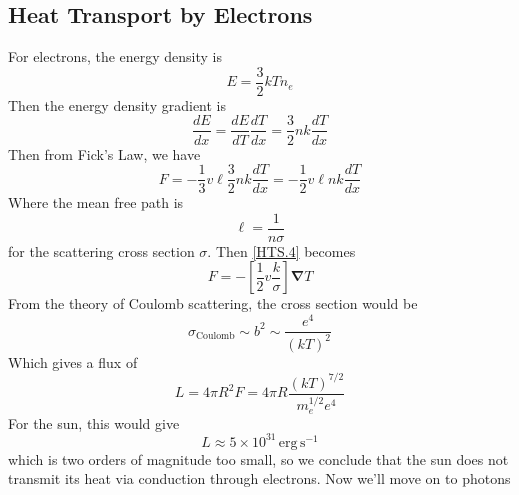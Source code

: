 \documentclass[10pt]{article}
\numberwithin{equation}{section}
\begin{document}
	\subsection{Heat Transport by Electrons} For electrons, the energy 
density is
	\begin{equation}
		\label{HTS.2} E=\frac{3}{2} kT n_e
	\end{equation}
	Then the energy density gradient is
	\begin{equation}
		\label{HTS.3} \frac{dE}{dx}=\frac{dE}{dT}\frac{dT}{dx}=\frac{3}{2}
nk\frac{dT}{dx}
	\end{equation}
	Then from Fick's Law, we have
	\begin{equation}
		\label{HTS.4} F=-\frac{1}{3}v\ell\frac{3}{2}nk\frac{dT}{dx}=-\frac
{1}{2}v\ell nk\frac{dT}{dx}
	\end{equation}
	Where the mean free path is
	\begin{equation}
		\label{HTS.5} \ell=\frac{1}{n\sigma}
	\end{equation}
	for the scattering cross section $\sigma$. Then \eqref{HTS.4} becomes
	\begin{equation}
		\label{HTS.6} F=-\left[\frac{1}{2} v\frac{k}{\sigma}\right]\bm
{\nabla}T
	\end{equation}
	From the theory of Coulomb scattering, the cross section would be
	\begin{equation}
		\label{HTS.7} \sigma_{\mathrm{Coulomb}}\sim b^2\sim\frac{e^4}{(kT)
^2}
	\end{equation}
	Which gives a flux of
	\begin{equation}
		\label{HTS.8} L=4\pi R^2F=4\pi R\frac{(kT)^{7/2}}{m_e^{1/2}e^4}
	\end{equation}
	For the sun, this would give
	\begin{equation}
		\label{HTS.9} L\approx 5\times 10^{31}\,\mathrm{erg\,s^{-1}}
	\end{equation}
	which is two orders of magnitude too small, so we conclude that the sun 
does not transmit its heat via conduction through electrons. Now we'll move 
on to photons
\end{document}
